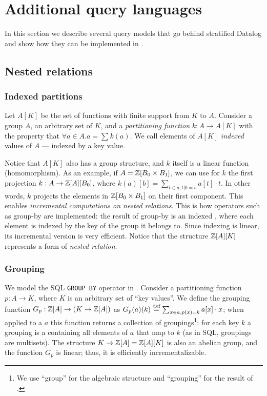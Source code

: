 \section{Additional query languages}\label{sec:extensions}

In this section we describe several query models that go behind stratified Datalog
and show how they can be implemented in \dbsp.

\subsection{Nested relations}

\subsubsection{Indexed partitions}

Let $A[K]$ be the set of functions with finite support from $K$ to $A$.
Consider a group $A$, an arbitrary set of  $K$, and a 
\emph{partitioning function} $k: A \to A[K]$ with the property that 
$\forall a \in A . a = \sum k(a)$.  We call elements of $A[K]$ \emph{indexed}
values of $A$ --- indexed by a key value.

Notice that $A[K]$ also has a group structure, and $k$ itself 
is a linear function (homomorphism).  As an example,
if $A = \mathbb{Z}[B_0 \times B_1]$, we can use for $k$ the first projection
$k: A \to \mathbb{Z}[A][B_0]$, where $k(a)[b] = \sum_{t \in a, t|0 = b} a[t] \cdot t$.
In other words, $k$ projects the elements in $\mathbb{Z}[B_0 \times B_1]$ on 
their first component.  This enables \emph{incremental computations
on nested relations}.  This is how operators such as group-by are
implemented: the result of group-by is an indexed \zr, where each 
element is indexed by the key of the group it belongs to.  Since
indexing is linear, its incremental version is very efficient.
Notice that the structure $\mathbb{Z}[A][K]$ represents a form of \emph{nested relation}.

\subsubsection{Grouping}

We model the SQL \texttt{GROUP BY} operator in \dbsp.  Consider a partitioning function
$p: A \to K$, where $K$ is an arbitrary set of ``key values''.  We define the grouping function
$G_p: \mathbb{Z}[A] \to (K \to \mathbb{Z}[A])$ as $G_p(a)(k) \stackrel{\textrm{\scriptsize def}}{=} \sum_{x \in a.p(x)=k}a[x] \cdot x$;
when applied to a \zr $a$ this function returns a collection of groupings\footnote{We use
``group'' for the algebraic structure and ``grouping'' for the result of .}: for each key $k$ a 
grouping is a \zr containing all elements of $a$ that map to $k$ (as in SQL, groupings are multisets).
The structure $K \to \mathbb{Z}[A] = \mathbb{Z}[A][K]$ is also an abelian group, and the function $G_p$ is linear; 
thus, it is efficiently incrementalizable.


